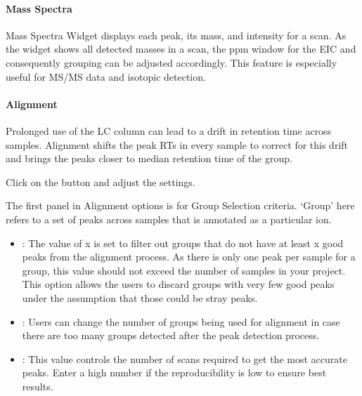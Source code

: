 \documentclass[letterpaper,10pt,english,openany,oneside]{sphinxmanual}
\begin{document}
\paragraph{Mass Spectra}
\label{\detokenize{IntroductiontoElMAVENUI:mass-spectra}}
Mass Spectra Widget displays each peak, its mass, and intensity for a scan. As the widget shows all detected masses in a scan, the ppm window for the EIC and consequently grouping can be adjusted accordingly. This feature is especially useful for MS/MS data and isotopic detection.



\paragraph{Alignment}
\label{\detokenize{IntroductiontoElMAVENUI:alignment}}
Prolonged use of the LC column can lead to a drift in retention time across samples. Alignment shifts the peak RTs in every sample to correct for this drift and brings the peaks closer to median retention time of the group.

Click on the  button  and adjust the settings.


The first panel in Alignment options is for Group Selection criteria. ‘Group’ here refers to a set of peaks across samples that is annotated as a particular ion.
\begin{itemize}
\item {} 
: The value of x is set to filter out groups that do not have at least x good peaks from the alignment process. As there is only one peak per sample for a group, this value should not exceed the number of samples in your project. This option allows the users to discard groups with very few good peaks under the assumption that those could be stray peaks.

\item {} 
: Users can change the number of groups being used for alignment in case there are too many groups detected after the peak detection process.

\item {} 
: This value controls the number of scans required to get the most accurate peaks. Enter a high number if the reproducibility is low to ensure best results.

\end{itemize}
\end{document}
